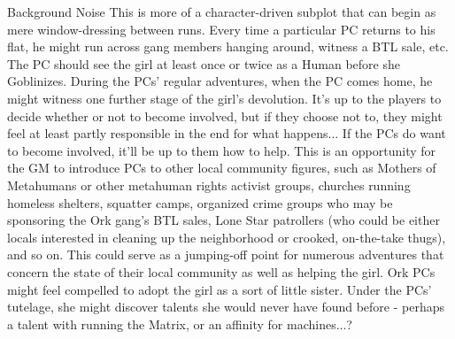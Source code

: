 \begin{scenario}{Background Noise}
\notes This is more of a character-driven subplot that can begin as mere window-dressing between runs. Every time a particular PC returns to his flat, he might run across gang members hanging around, witness a BTL sale, etc. The PC should see the girl at least once or twice as a Human before she Goblinizes. During the PCs' regular adventures, when the PC comes home, he might witness one further stage of the girl's devolution. It's up to the players to decide whether or not to become involved, but if they choose not to, they might feel at least partly responsible in the end for what happens... If the PCs do want to become involved, it'll be up to them how to help. This is an opportunity for the GM to introduce PCs to other local community figures, such as Mothers of Metahumans or other metahuman rights activist groups, churches running homeless shelters, squatter camps, organized crime groups who may be sponsoring the Ork gang's BTL sales, Lone Star patrollers (who could be either locals interested in cleaning up the neighborhood or crooked, on-the-take thugs), and so on. This could serve as a jumping-off point for numerous adventures that concern the state of their local community as well as helping the girl. Ork PCs might feel compelled to adopt the girl as a sort of little sister. Under the PCs' tutelage, she might discover talents she would never have found before - perhaps a talent with running the Matrix, or an affinity for machines...? 

\end{scenario}